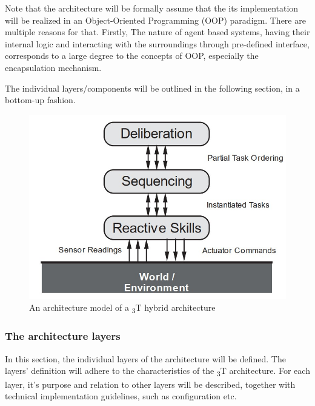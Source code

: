 \documentclass[main.tex]{subfiles}
\begin{document}
Note that the architecture will be formally assume that the its implementation will be realized 
in an Object-Oriented Programming (OOP) paradigm. There are multiple reasons for that. Firstly, 
The nature of agent based systems, having their internal logic and interacting with the surroundings 
through pre-defined interface, corresponds to a large degree to the concepts of OOP, especially
the encapsulation mechanism.

The individual layers/components will be outlined in the following section, in a bottom-up
fashion.

\begin{figure}[htbp]
    \centering
    \includegraphics[width=.8\textwidth]{3t-arch.jpg}
    \caption{An architecture model of a \textsubscript{3}T hybrid architecture \cite{Bonasso1995}}
    \label{3-arch2}
\end{figure}



\subsubsection{The architecture layers}

In this section, the individual layers of the architecture will be defined. The layers' definition will 
adhere to the characteristics of the \textsubscript{3}T architecture. For each layer, it's purpose and 
relation to other layers will be described, together with technical implementation guidelines, such as 
configuration etc.
\end{document}
